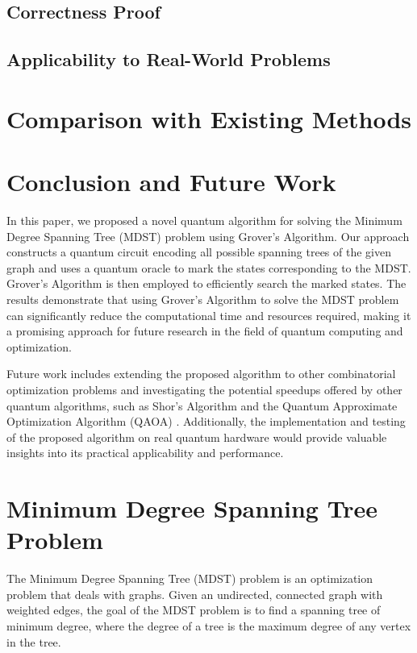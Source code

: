 \subsection{Correctness Proof}

\subsection{Applicability to Real-World Problems}

\section{Comparison with Existing Methods}
\label{sec:comparison}

\section{Conclusion and Future Work}
\label{sec:conclusion}

In this paper, we proposed a novel quantum algorithm for solving the Minimum Degree Spanning Tree (MDST) problem using Grover's Algorithm. Our approach constructs a quantum circuit encoding all possible spanning trees of the given graph and uses a quantum oracle to mark the states corresponding to the MDST. Grover's Algorithm is then employed to efficiently search the marked states. The results demonstrate that using Grover's Algorithm to solve the MDST problem can significantly reduce the computational time and resources required, making it a promising approach for future research in the field of quantum computing and optimization.

Future work includes extending the proposed algorithm to other combinatorial optimization problems and investigating the potential speedups offered by other quantum algorithms, such as Shor's Algorithm \cite{shor} and the Quantum Approximate Optimization Algorithm (QAOA) \cite{QAOA}. Additionally, the implementation and testing of the proposed algorithm on real quantum hardware would provide valuable insights into its practical applicability and performance.

\section{Minimum Degree Spanning Tree Problem}

The Minimum Degree Spanning Tree (MDST) problem is an optimization problem that deals with graphs. Given an undirected, connected graph with weighted edges, the goal of the MDST problem is to find a spanning tree of minimum degree, where the degree of a tree is the maximum degree of any vertex in the tree.

